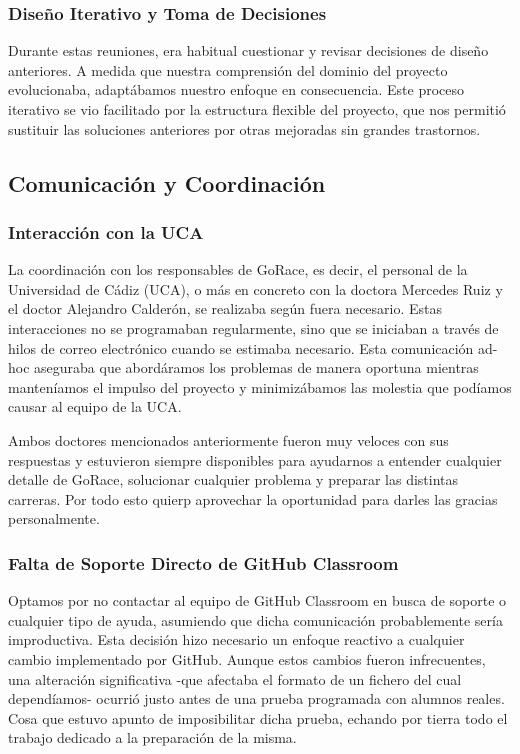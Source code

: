 \subsubsection{Diseño Iterativo y Toma de Decisiones}
Durante estas reuniones, era habitual cuestionar y revisar decisiones de diseño anteriores. A medida que nuestra comprensión del dominio del proyecto evolucionaba, adaptábamos nuestro enfoque en consecuencia. Este proceso iterativo se vio facilitado por la estructura flexible del proyecto, que nos permitió sustituir las soluciones anteriores por otras mejoradas sin grandes trastornos.

\subsection{Comunicación y Coordinación}

\subsubsection{Interacción con la UCA}
La coordinación con los responsables de GoRace, es decir, el personal de la Universidad de Cádiz (\acrshort{UCA}), o más en concreto con la doctora Mercedes Ruiz y el doctor Alejandro Calderón, se realizaba según fuera necesario. Estas interacciones no se programaban regularmente, sino que se iniciaban a través de hilos de correo electrónico cuando se estimaba necesario. Esta comunicación ad-hoc aseguraba que abordáramos los problemas de manera oportuna mientras manteníamos el impulso del proyecto y minimizábamos las molestia que podíamos causar al equipo de la UCA.

Ambos doctores mencionados anteriormente fueron muy veloces con sus respuestas y estuvieron siempre disponibles para ayudarnos a entender cualquier detalle de GoRace, solucionar cualquier problema y preparar las distintas carreras. Por todo esto quierp aprovechar la oportunidad para darles las gracias personalmente.

\subsubsection{Falta de Soporte Directo de GitHub Classroom}
Optamos por no contactar al equipo de GitHub Classroom en busca de soporte o cualquier tipo de ayuda, asumiendo que dicha comunicación probablemente sería improductiva. Esta decisión hizo necesario un enfoque reactivo a cualquier cambio implementado por GitHub. Aunque estos cambios fueron infrecuentes, una alteración significativa -que afectaba el formato de un fichero del cual dependíamos- ocurrió justo antes de una prueba programada con alumnos reales. Cosa que estuvo apunto de imposibilitar dicha prueba, echando por tierra todo el trabajo dedicado a la preparación de la misma.

